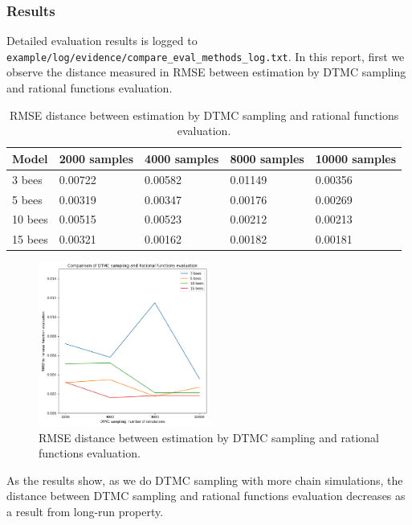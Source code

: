 \documentclass[12pt]{article}
\theoremstyle{definition}
\begin{document}
\subsubsection{Results}
Detailed evaluation results is logged to
\texttt{example/log/evidence/compare\_eval\_methods\_log.txt}. In this report,
first we observe the distance measured in RMSE between estimation by DTMC
sampling and rational functions evaluation.

\begin{table}[H]
  \begin{tabular}{|l|l|l|l|l|}
    \hline
    Model   & 2000 samples          & 4000 samples          & 8000 samples          & 10000 samples         \\ \hline
    3 bees  & 0.00722 & 0.00582 & 0.01149 & 0.00356 \\ \hline
    5 bees  & 0.00319 & 0.00347 & 0.00176 & 0.00269 \\ \hline
    10 bees & 0.00515 & 0.00523 & 0.00212 & 0.00213 \\ \hline
    15 bees & 0.00321 & 0.00162 & 0.00182 & 0.00181 \\ \hline
  \end{tabular}
  \caption{RMSE distance between estimation by DTMC sampling and rational functions evaluation.}
\end{table}

\begin{figure}[H]
  \centering
  \includegraphics[width=0.5\textwidth,keepaspectratio]{figures/ex2_1.png}
  \caption{RMSE distance between estimation by DTMC sampling and rational functions evaluation.}
\end{figure}

As the results show, as we do DTMC sampling with more chain simulations, the
distance between DTMC sampling and rational functions evaluation decreases as a
result from long-run property.
\end{document}
